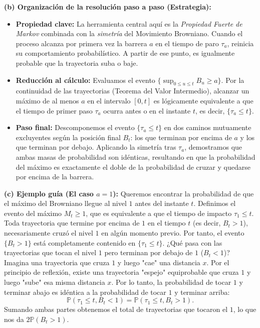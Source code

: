 \documentclass[11pt, letterpaper]{article}
\begin{document}
\begin{solucion}
    \textbf{(b) Organización de la resolución paso a paso (Estrategia):}
    \begin{itemize}
        \item[(i)] \textbf{Propiedad clave:} La herramienta central aquí es la \textit{Propiedad Fuerte de Markov} combinada con la \textit{simetría} del Movimiento Browniano. Cuando el proceso alcanza por primera vez la barrera $a$ en el tiempo de paro $\tau_a$, reinicia su comportamiento probabilístico. A partir de ese punto, es igualmente probable que la trayectoria suba o baje.
        \item[(ii)] \textbf{Reducción al cálculo:} Evaluamos el evento $\{\sup_{0 \le u \le t} B_u \ge a\}$. Por la continuidad de las trayectorias (Teorema del Valor Intermedio), alcanzar un máximo de al menos $a$ en el intervalo $[0, t]$ es lógicamente equivalente a que el tiempo de primer paso $\tau_a$ ocurra antes o en el instante $t$, es decir, $\{\tau_a \le t\}$.
        \item[(iii)] \textbf{Paso final:} Descomponemos el evento $\{\tau_a \le t\}$ en dos caminos mutuamente excluyentes según la posición final $B_t$: los que terminan por encima de $a$ y los que terminan por debajo. Aplicando la simetría tras $\tau_a$, demostramos que ambas masas de probabilidad son idénticas, resultando en que la probabilidad del máximo es exactamente el doble de la probabilidad de cruzar y quedarse por encima de la barrera.
    \end{itemize}

    \vspace{3mm}
    \textbf{(c) Ejemplo guía (El caso $a = 1$):}
    Queremos encontrar la probabilidad de que el máximo del Browniano llegue al nivel $1$ antes del instante $t$.
    Definimos el evento del máximo $M_t \ge 1$, que es equivalente a que el tiempo de impacto $\tau_1 \le t$.
    Toda trayectoria que termine por encima de $1$ en el tiempo $t$ (es decir, $B_t > 1$), necesariamente cruzó el nivel $1$ en algún momento previo. Por tanto, el evento $\{B_t > 1\}$ está completamente contenido en $\{\tau_1 \le t\}$.
    ¿Qué pasa con las trayectorias que tocan el nivel $1$ pero terminan por debajo de $1$ ($B_t < 1$)? Imagina una trayectoria que cruza $1$ y luego "cae" una distancia $x$. Por el principio de reflexión, existe una trayectoria "espejo" equiprobable que cruza $1$ y luego "sube" esa misma distancia $x$. 
    Por lo tanto, la probabilidad de tocar $1$ y terminar abajo es idéntica a la probabilidad de tocar $1$ y terminar arriba:
    \[ \mathbb{P}(\tau_1 \le t, B_t < 1) = \mathbb{P}(\tau_1 \le t, B_t > 1). \]
    Sumando ambas partes obtenemos el total de trayectorias que tocaron el $1$, lo que nos da $2\mathbb{P}(B_t > 1)$.


\end{solucion}
\end{document}
